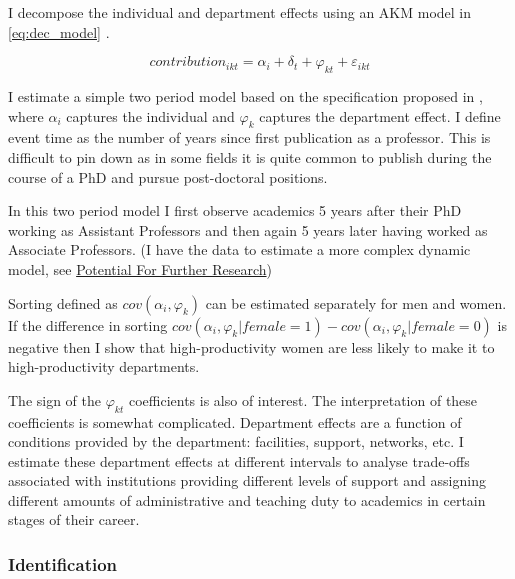\documentclass[10pt]{report}
\begin{document}
I decompose the individual and department effects using an AKM model in \autoref{eq:dec_model} \parencite[]{Abowd1999}.

\begin{equation}
    \label{eq:dec_model}
    contribution_{ikt} = \alpha_i + \delta_t + \varphi_{kt} + \varepsilon_{ikt}
\end{equation}

I estimate a simple two period model based on the specification proposed in \textcite{Bonhomme2019}, where \(\alpha_i\) captures the individual and \(\varphi_k\) captures the department effect. I define event time as the number of years since first publication as a professor. This is difficult to pin down as in some fields it is quite common to publish during the course of a PhD and pursue post-doctoral positions.



In this two period model I first observe academics 5 years after their PhD working as Assistant Professors and then again 5 years later having worked as Associate Professors. (I have the data to estimate a more complex dynamic model, see \hyperref[sec:potential]{Potential For Further Research})

Sorting defined as \(cov(\alpha_i, \varphi_k)\) can be estimated separately for men and women. If the difference in sorting \(cov(\alpha_i, \varphi_k | female = 1) - cov(\alpha_i, \varphi_k | female = 0)\) is negative then I show that high-productivity women are less likely to make it to high-productivity departments.

The sign of the \(\varphi_{kt}\) coefficients is also of interest. The interpretation of these coefficients is somewhat complicated. Department effects are a function of conditions provided by the department: facilities, support, networks, etc. I estimate these department effects at different intervals to analyse trade-offs associated with institutions providing different levels of support and assigning different amounts of administrative and teaching duty to academics in certain stages of their career.

\subsubsection*{Identification}
\end{document}
